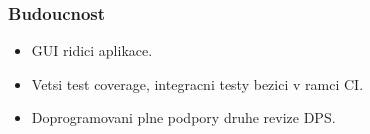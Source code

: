 \documentclass[%
  12pt,       				%
	t,                  %
	aspectratio=1610,   %
	unicode,						%
]{beamer}				    	%
\begin{document}
\begin{frame}
	\frametitle{Budoucnost}
	\begin{itemize}
		\item GUI ridici aplikace.
		\item Vetsi test coverage, integracni testy bezici v ramci CI.
		\item Doprogramovani plne podpory druhe revize DPS.
	\end{itemize}
\end{frame}

%
%
%
%
%
%
\end{document}
